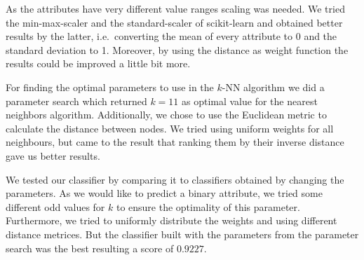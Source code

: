 \documentclass[a4paper,11pt]{article}
\begin{document}
        As the attributes have very different value ranges scaling was needed. We tried the min-max-scaler and the standard-scaler of scikit-learn and obtained better results by the latter, i.e.\ converting the mean of every attribute to 0 and the standard deviation to 1. Moreover, by using the distance as weight function the results could be improved a little bit more.
        
        For finding the optimal parameters to use in the $k$-NN algorithm we did a parameter search which returned $k=11$ as optimal value for the nearest neighbors algorithm. Additionally, we chose to use the Euclidean metric to calculate the distance between nodes. We tried using uniform weights for all neighbours, but came to the result that ranking them by their inverse distance gave us better results.
        
        We tested our classifier by comparing it to classifiers obtained by changing the parameters. As we would like to predict a binary attribute, we tried some different odd values for $k$ to ensure the optimality of this parameter. Furthermore, we tried to uniformly distribute the weights and using different distance metrices. But the classifier built with the parameters from the parameter search was the best resulting a score of $0.9227$. 
    
        
        
\end{document}
